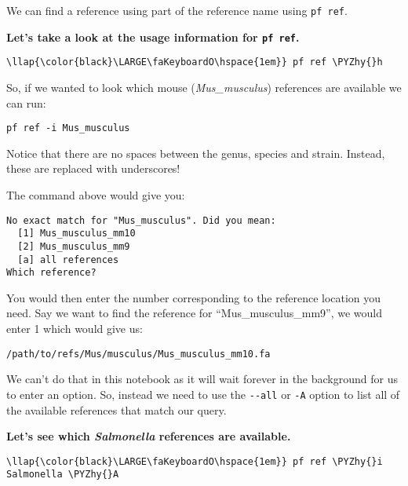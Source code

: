 \documentclass[11pt]{article}
\def\PYZhy{\char`\-}
\begin{document}
    We can find a reference using part of the reference name using
\texttt{pf\ ref}.

\textbf{Let's take a look at the usage information for
\texttt{pf\ ref}.}

\begin{terminalinput}
\begin{Verbatim}[commandchars=\\\{\}]
\llap{\color{black}\LARGE\faKeyboardO\hspace{1em}} pf ref \PYZhy{}h
\end{Verbatim}
\end{terminalinput}

    So, if we wanted to look which mouse (\textit{Mus\_musculus}) references
are available we can run:

\begin{verbatim}
pf ref -i Mus_musculus
\end{verbatim}

Notice that there are no spaces between the genus, species and strain.
Instead, these are replaced with underscores!

The command above would give you:

\begin{verbatim}
No exact match for "Mus_musculus". Did you mean:
  [1] Mus_musculus_mm10
  [2] Mus_musculus_mm9
  [a] all references
Which reference?
\end{verbatim}

You would then enter the number corresponding to the reference location
you need. Say we want to find the reference for ``Mus\_musculus\_mm9'',
we would enter 1 which would give us:

\begin{verbatim}
/path/to/refs/Mus/musculus/Mus_musculus_mm10.fa
\end{verbatim}

We can't do that in this notebook as it will wait forever in the
background for us to enter an option. So, instead we need to use the
\texttt{-\/-all} or \texttt{-A} option to list all of the available
references that match our query.

\textbf{Let's see which \textit{Salmonella} references are available.}

\begin{terminalinput}
\begin{Verbatim}[commandchars=\\\{\}]
\llap{\color{black}\LARGE\faKeyboardO\hspace{1em}} pf ref \PYZhy{}i Salmonella \PYZhy{}A
\end{Verbatim}
\end{terminalinput}
\end{document}
